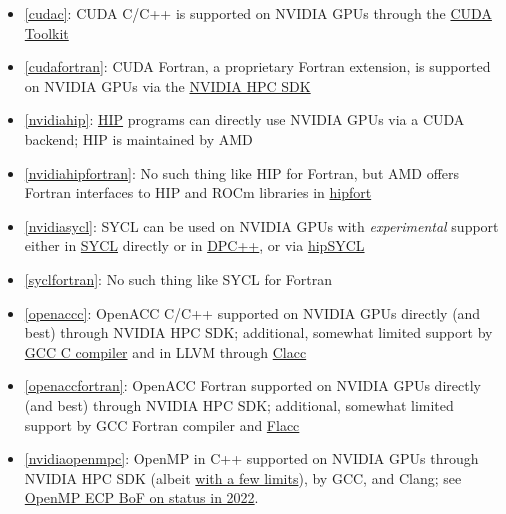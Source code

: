 \begin{frame}[allowframebreaks]
\begin{itemize}
    \ifdefined\tightlist\tightlist\fi%
        \item \ref{cudac}: CUDA C/C++ is supported on NVIDIA GPUs through the \href{https://developer.nvidia.com/cuda-toolkit}{CUDA Toolkit}
        \item \ref{cudafortran}: CUDA Fortran, a proprietary Fortran extension, is supported on NVIDIA GPUs via the \href{https://developer.nvidia.com/hpc-sdk}{NVIDIA HPC SDK}
        \item \ref{nvidiahip}: \href{https://github.com/ROCm-Developer-Tools/HIP}{HIP} programs can directly use NVIDIA GPUs via a CUDA backend; HIP is maintained by AMD
        \item \ref{nvidiahipfortran}: No such thing like HIP for Fortran, but AMD offers Fortran interfaces to HIP and ROCm libraries in \href{https://github.com/ROCmSoftwarePlatform/hipfort}{hipfort}
        \item \ref{nvidiasycl}: SYCL can be used on NVIDIA GPUs with \emph{experimental} support either in \href{https://github.com/codeplaysoftware/sycl-for-cuda/blob/cuda/sycl/doc/GetStartedWithSYCLCompiler.md\#build-sycl-toolchain-with-support-for-nvidia-cuda}{SYCL} directly or in \href{https://github.com/intel/llvm/blob/sycl/sycl/doc/GetStartedGuide.md\#build-dpc-toolchain-with-support-for-nvidia-cuda}{DPC++}, or via \href{https://github.com/illuhad/hipSYCL}{hipSYCL}
        \item \ref{syclfortran}: No such thing like SYCL for Fortran
        \item \ref{openaccc}: OpenACC C/C++ supported on NVIDIA GPUs directly (and best) through NVIDIA HPC SDK; additional, somewhat limited support by \href{https://gcc.gnu.org/wiki/OpenACC}{GCC C compiler} and in LLVM through \href{https://csmd.ornl.gov/project/clacc}{Clacc}
        \item \ref{openaccfortran}: OpenACC Fortran supported on NVIDIA GPUs directly (and best) through NVIDIA HPC SDK; additional, somewhat limited support by GCC Fortran compiler and \href{https://ieeexplore.ieee.org/document/9651310}{Flacc}
        \item \ref{nvidiaopenmpc}: OpenMP in C++ supported on NVIDIA GPUs through NVIDIA HPC SDK (albeit \href{https://docs.nvidia.com/hpc-sdk/compilers/hpc-compilers-user-guide/index.html\#openmp-use}{with a few limits}), by GCC, and Clang; see \href{https://www.openmp.org/wp-content/uploads/2022_ECP_Community_BoF_Days-OpenMP_RoadMap_BoF.pdf}{OpenMP ECP BoF on status in 2022}.

\end{itemize}
\end{frame}
